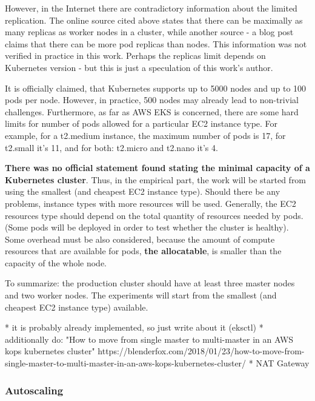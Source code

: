 However, in the Internet there are contradictory information about the limited replication. The online source cited above\cite{kubernetes-node-size} states that there can be maximally as many replicas as worker nodes in a cluster, while another source - a blog post\cite{learnk8s-ll} claims that there can be more pod replicas than nodes. This information was not verified in practice in this work. Perhaps the replicas limit depends on Kubernetes version - but this is just a speculation of this work's author.

It is officially claimed, that Kubernetes supports up to 5000 nodes and up to 100 pods per node\cite{kubernetes-node-size}\cite{kubernetes-large}. However, in practice, 500 nodes may already lead to non-trivial challenges. Furthermore, as far as AWS EKS is concerned, there are some hard limits for number of pods allowed for a particular EC2 instance type. For example, for a t2.medium instance, the maximum number of pods is 17, for t2.small it's 11, and for both: t2.micro and t2.nano it's 4\cite{kubernetes-node-size}\cite{eks-hard-limits}.

\textbf{There was no official statement found stating the minimal capacity of a Kubernetes cluster}. Thus, in the empirical part, the work will be started from using the smallest (and cheapest EC2 instance type). Should there be any problems, instance types with more resources will be used. Generally, the EC2 resources type should depend on the total quantity of resources needed by pods. (Some pods will be deployed in order to test whether the cluster is healthy). Some overhead must be also considered, because the amount of compute resources that are available for pods, \textbf{the allocatable}, is smaller than the capacity of the whole node\cite{k8s-alloc}.

To summarize: the production cluster should have at least three master nodes and two worker nodes. The experiments will start from the smallest (and cheapest EC2 instance type) available.

* it is probably already implemented, so just write about it (eksctl)
* additionally do: "How to move from single master to multi-master in an AWS kops kubernetes cluster" https://blenderfox.com/2018/01/23/how-to-move-from-single-master-to-multi-master-in-an-aws-kops-kubernetes-cluster/
* NAT Gateway

\subsubsection{Autoscaling}

